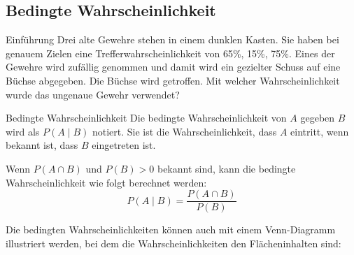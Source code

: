 















\clearpage

\subsection{Bedingte Wahrscheinlichkeit}

\begin{bsp}
  {Einführung}{}
  Drei alte Gewehre stehen in einem dunklen Kasten. Sie haben bei genauem Zielen eine Trefferwahrscheinlichkeit von 65\%, 15\%, 75\%. Eines der Gewehre wird zufällig genommen und damit wird ein gezielter Schuss auf eine Büchse abgegeben. Die Büchse wird getroffen. Mit welcher Wahrscheinlichkeit wurde das ungenaue Gewehr verwendet?

  \vspace*{18cm}
\end{bsp}
\clearpage
\begin{definition}
  {Bedingte Wahrscheinlichkeit}{}
  Die bedingte Wahrscheinlichkeit von \(A\) gegeben \(B\) wird als \(P(A\mid B)\) notiert. Sie ist die Wahrscheinlichkeit, dass \(A\) eintritt, wenn bekannt ist, dass \(B\) eingetreten ist.

  Wenn \(P(A\cap B)\) und \(P(B) > 0\) bekannt sind, kann die bedingte Wahrscheinlichkeit wie folgt berechnet werden:
  \[P(A\mid B) = \frac{P(A\cap B)}{P(B)}\]
\end{definition}
Die bedingten Wahrscheinlichkeiten können auch mit einem Venn-Diagramm illustriert werden, bei dem die Wahrscheinlichkeiten den Flächeninhalten sind:
